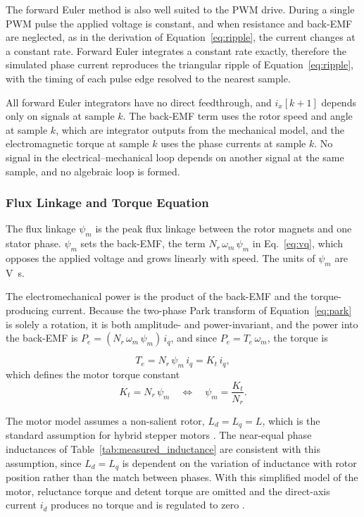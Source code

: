 The forward Euler method is also well suited to the PWM drive. During a single PWM pulse the applied voltage is constant, and when resistance and back-EMF are neglected, as in the derivation of Equation~\eqref{eq:ripple}, the current changes at a constant rate. Forward Euler integrates a constant rate exactly, therefore the simulated phase current reproduces the triangular ripple of Equation~\eqref{eq:ripple}, with the timing of each pulse edge resolved to the nearest sample.


All forward Euler integrators have no direct feedthrough, and $i_x[k+1]$ depends only on signals at sample $k$. The back-EMF term uses the rotor speed and angle at sample $k$, which are integrator outputs from the mechanical model, and the electromagnetic torque at sample $k$ uses the phase currents at sample $k$. No signal in the electrical--mechanical loop depends on another signal at the same sample, and no algebraic loop is formed. 


\subsubsection{Flux Linkage and Torque Equation}

The flux linkage $\psi_m$ is the peak flux linkage between the rotor magnets and one stator phase. $\psi_m$ sets the back-EMF, the term $N_r\,\omega_m\,\psi_m$ in Eq.~\eqref{eq:vq}, which opposes the applied voltage and grows linearly with speed. The units of $\psi_m$ are \si{\volt\second}.

The electromechanical power is the product of the back-EMF and the
torque-producing current. Because the two-phase Park transform of Equation~\eqref{eq:park} is solely a rotation, it is both amplitude- and power-invariant, and the power into the back-EMF is $P_e = (N_r\,\omega_m\,\psi_m)\, i_q$, and since $P_e = T_e\,\omega_m$, the torque is

\begin{equation}
	T_e = N_r\,\psi_m\, i_q = K_t\, i_q,
	\label{eq:Te}
\end{equation}
which defines the motor torque constant
\begin{equation}
	K_t = N_r\,\psi_m
	\quad\Longleftrightarrow\quad
	\psi_m = \frac{K_t}{N_r}.
	\label{eq:psim}
\end{equation}


The motor model assumes a non-salient rotor, $L_d = L_q = L$, which is the standard assumption for hybrid stepper motors \cite{henke_modeling_2013,derammelaere_linear_2010}. The near-equal phase inductances of Table~\ref{tab:measured_inductance} are consistent with this assumption, since $L_d = L_q$ is dependent on the variation of inductance with rotor position rather than the match between phases. With this simplified model of the motor, reluctance torque and detent torque are omitted and the direct-axis current $i_d$ produces no torque and is regulated to zero \cite{henke_modeling_2013}.

